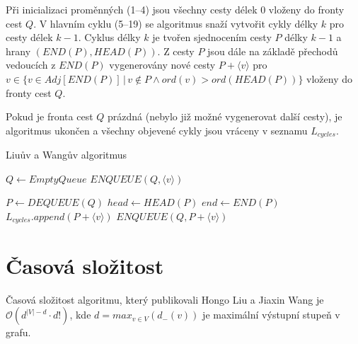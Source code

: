         Při inicializaci proměnných (1--4) jsou všechny cesty délek 0 vloženy do fronty cest $Q$. V hlavním cyklu (5--19) se algoritmus snaží vytvořit cykly délky $k$ pro cesty délek $k-1$. Cyklus délky $k$ je tvořen sjednocením cesty $P$ délky $k-1$ a hrany $(\textit{END}(P), \textit{HEAD}(P))$. Z cesty $P$ jsou dále na základě přechodů vedoucích z $\textit{END}(P)$ vygenerovány nové cesty $P + \langle v \rangle$ pro $v \in \{v \in Adj[\textit{END}(P)] \,|\, v \notin P \land ord(v) > ord(\textit{HEAD}(P))\}$ vloženy do fronty cest $Q$.

        Pokud je fronta cest $Q$ prázdná (nebylo již možné vygenerovat další cesty), je algoritmus ukončen a všechny objevené cykly jsou vráceny v seznamu $L_{cycles}$.

        \newpage

        \begin{algorithm}
            \DontPrintSemicolon
            \caption{Liuův a Wangův algoritmus}
            \vspace*{0.5em}

            \;
            $Q \leftarrow EmptyQueue$\;
            {
                $\mathit{ENQUEUE}(Q, \langle v \rangle)$\;
            }
            \vspace*{0.5em}

            {
                $P \leftarrow \mathit{DEQUEUE}(Q)$\;
                $head \leftarrow \mathit{HEAD}(P)$\;
                $end \leftarrow \mathit{END}(P)$\;
                {
                    {
                        $L_{cycles}.append(P + \langle v \rangle)$\;
                    }
                    {
                        {
                            $\mathit{ENQUEUE}(Q, P + \langle v \rangle)$\;
                        }
                    }
                }
            }
            \vspace*{0.5em}


        \end{algorithm}

    \section{Časová složitost}
        \begin{theorem}
            Časová složitost algoritmu, který publikovali Hongo Liu a Jiaxin Wang je $\mathcal{O}(d^{|V|-d}\cdot d!)$, kde $d = max_{v\in V}(d_-(v))$ je maximální výstupní stupeň v grafu.
        \end{theorem}

